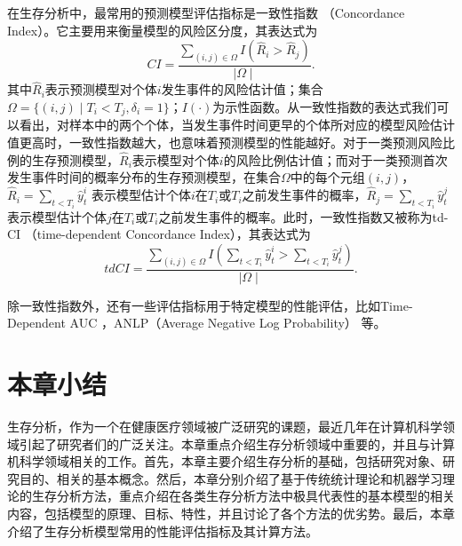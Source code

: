 在生存分析中，最常用的预测模型评估指标是一致性指数 （Concordance Index）。它主要用来衡量模型的风险区分度，其表达式为
\begin{equation}
CI=\frac{\sum_{(i,j)\in \Omega} I(\hat{R}_i > \hat{R}_j)}{\mid \Omega \mid}. \label{F13}
\end{equation}
其中$\hat{R}_i$表示预测模型对个体$i$发生事件的风险估计值；集合$\Omega=\{(i,j)\mid T_i<T_j,\delta_i=1\}$；$I(\cdot)$为示性函数。从一致性指数的表达式我们可以看出，对样本中的两个个体，当发生事件时间更早的个体所对应的模型风险估计值更高时，一致性指数越大，也意味着预测模型的性能越好。对于一类预测风险比例的生存预测模型，$\hat{R}_i$表示模型对个体$i$的风险比例估计值；而对于一类预测首次发生事件时间的概率分布的生存预测模型，在集合$\Omega$中的每个元组$(i,j)$，$\hat{R}_i=\sum_{t<T_i} \hat{y}_t^i$ 表示模型估计个体$i$在$T_i$或$T_i$之前发生事件的概率，$\hat{R}_j=\sum_{t<T_i} \hat{y}_t^j$ 表示模型估计个体$j$在$T_i$或$T_i$之前发生事件的概率。此时，一致性指数又被称为td-CI （time-dependent Concordance Index），其表达式为
\begin{equation}
tdCI=\frac{\sum_{(i,j)\in \Omega} I(\sum_{t<T_i} \hat{y}_t^i > \sum_{t<T_i} \hat{y}_t^j)}{\mid \Omega \mid}.\label{F14}
\end{equation}

除一致性指数外，还有一些评估指标用于特定模型的性能评估，比如Time-Dependent AUC ，ANLP（Average Negative Log Probability） 等。

\section{本章小结}

生存分析，作为一个在健康医疗领域被广泛研究的课题，最近几年在计算机科学领域引起了研究者们的广泛关注。本章重点介绍生存分析领域中重要的，并且与计算机科学领域相关的工作。首先，本章主要介绍生存分析的基础，包括研究对象、研究目的、相关的基本概念。然后，本章分别介绍了基于传统统计理论和机器学习理论的生存分析方法，重点介绍在各类生存分析方法中极具代表性的基本模型的相关内容，包括模型的原理、目标、特性，并且讨论了各个方法的优劣势。最后，本章介绍了生存分析模型常用的性能评估指标及其计算方法。
